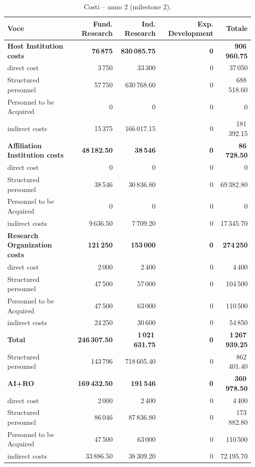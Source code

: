 \documentclass{plan4ari_report}
\begin{document}
\clearpage
\begin{table}[H]\centering\small
\caption{Costi -- anno 2 (milestone 2).}\label{tab:bpy-c-y2}
\begin{tabular}{lrrrr}\toprule
\textbf{Voce} & \textbf{Fund. Research} & \textbf{Ind. Research} & \textbf{Exp. Development} & \textbf{Totale} \\\midrule
\textbf{Host Institution costs} & \textbf{76\,875} & \textbf{830\,085.75} & \textbf{0} & \textbf{906\,960.75} \\
\quad direct cost & 3\,750 & 33\,300 & 0 & 37\,050 \\
\quad Structured personnel & 57\,750 & 630\,768.60 & 0 & 688\,518.60 \\
\quad Personnel to be Acquired & 0 & 0 & 0 & 0 \\
\quad indirect costs & 15\,375 & 166\,017.15 & 0 & 181\,392.15 \\
\textbf{Affiliation Institution costs} & \textbf{48\,182.50} & \textbf{38\,546} & \textbf{0} & \textbf{86\,728.50} \\
\quad direct cost & 0 & 0 & 0 & 0 \\
\quad Structured personnel & 38\,546 & 30\,836.80 & 0 & 69\,382.80 \\
\quad Personnel to be Acquired & 0 & 0 & 0 & 0 \\
\quad indirect costs & 9\,636.50 & 7\,709.20 & 0 & 17\,345.70 \\
\textbf{Research Organization costs} & \textbf{121\,250} & \textbf{153\,000} & \textbf{0} & \textbf{274\,250} \\
\quad direct cost & 2\,000 & 2\,400 & 0 & 4\,400 \\
\quad Structured personnel & 47\,500 & 57\,000 & 0 & 104\,500 \\
\quad Personnel to be Acquired & 47\,500 & 63\,000 & 0 & 110\,500 \\
\quad indirect costs & 24\,250 & 30\,600 & 0 & 54\,850 \\
\midrule
\textbf{Total} & \textbf{246\,307.50} & \textbf{1\,021\,631.75} & \textbf{0} & \textbf{1\,267\,939.25} \\
\quad Structured personnel & 143\,796 & 718\,605.40 & 0 & 862\,401.40 \\
\textbf{AI+RO} & \textbf{169\,432.50} & \textbf{191\,546} & \textbf{0} & \textbf{360\,978.50} \\
\quad direct cost & 2\,000 & 2\,400 & 0 & 4\,400 \\
\quad Structured personnel & 86\,046 & 87\,836.80 & 0 & 173\,882.80 \\
\quad Personnel to be Acquired & 47\,500 & 63\,000 & 0 & 110\,500 \\
\quad indirect costs & 33\,886.50 & 38\,309.20 & 0 & 72\,195.70 \\
\bottomrule\end{tabular}
\end{table}
\end{document}
